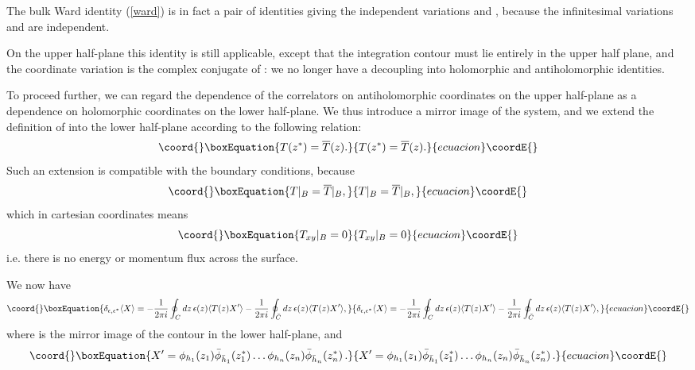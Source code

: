 \documentclass[a4paper,12pt]{report}
\begin{document}
\vspace{0.5cm}

The bulk Ward identity (\ref{ward}) is in fact a pair of identities giving the independent variations
\coordHE{} and \coordHE{}, because the infinitesimal
variations \coordHE{} and \coordHE{} are independent.

On the upper half-plane this identity is still applicable, except that the integration contour \coordHE{} must lie
entirely in the upper half plane, and the coordinate variation \myHighlight{$\bar{\epsilon}$}\coordHE{} is the complex conjugate of
\myHighlight{$\epsilon$}\coordHE{}: we no longer have a decoupling into holomorphic and antiholomorphic identities.

To proceed further, we can regard the dependence of the correlators on antiholomorphic coordinates \coordHE{}
on the upper half-plane as a dependence on holomorphic coordinates \coordHE{} on the lower
half-plane. We thus introduce a mirror image of the system, and we extend the definition of \coordHE{} into the lower
half-plane according to the following relation:
\begin{equation}\coord{}\boxEquation{
T(z^{*})=\overline{T}(z).
}{
T(z^{*})=\overline{T}(z).
}{ecuacion}\coordE{}\end{equation}
Such an extension is compatible with the boundary conditions, because
\begin{equation}\coord{}\boxEquation{
T|_{B}=\overline{T}|_{B},
}{
T|_{B}=\overline{T}|_{B},
}{ecuacion}\coordE{}\end{equation}
which in cartesian coordinates means
\begin{equation}\coord{}\boxEquation{
T_{xy}|_{B}=0
}{
T_{xy}|_{B}=0
}{ecuacion}\coordE{}\end{equation}
i.e. there is no energy or momentum flux across the surface.

We now have
\begin{equation}\coord{}\boxEquation{
\delta_{\epsilon,\epsilon^{*}}\langle X\rangle=-\frac{1}{2\pi i}\oint_{C}dz\,\epsilon(z)\langle T(z)X'\rangle
-\frac{1}{2\pi i}\oint_{\bar{C}}dz\,\epsilon(z)\langle T(z)X'\rangle,
}{
\delta_{\epsilon,\epsilon^{*}}\langle X\rangle=-\frac{1}{2\pi i}\oint_{C}dz\,\epsilon(z)\langle T(z)X'\rangle
-\frac{1}{2\pi i}\oint_{\bar{C}}dz\,\epsilon(z)\langle T(z)X'\rangle,
}{ecuacion}\coordE{}\end{equation}
where \coordHE{} is the mirror image of the contour \coordHE{} in the lower half-plane, and
\begin{equation}\coord{}\boxEquation{
X'=\phi_{h_{1}}(z_{1})\bar{\phi}_{\bar{h}_{1}}(z_{1}^{*})\ldots
\phi_{h_{n}}(z_{n})\bar{\phi}_{\bar{h}_{n}}(z_{n}^{*})\,.
}{
X'=\phi_{h_{1}}(z_{1})\bar{\phi}_{\bar{h}_{1}}(z_{1}^{*})\ldots
\phi_{h_{n}}(z_{n})\bar{\phi}_{\bar{h}_{n}}(z_{n}^{*})\,.
}{ecuacion}\coordE{}\end{equation}
\end{document}

